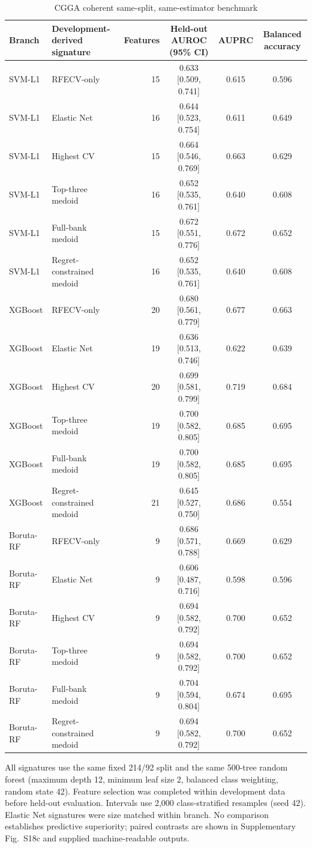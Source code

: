 \begin{table}[H]
\centering
\caption{CGGA coherent same-split, same-estimator benchmark}
\label{tab:supp17}
\scriptsize
\begin{tabular}{llrccc}
\toprule
Branch & Development-derived signature & Features & Held-out AUROC (95\% CI) & AUPRC & Balanced accuracy \\
\midrule
SVM-L1 & RFECV-only & 15 & 0.633 [0.509, 0.741] & 0.615 & 0.596 \\
SVM-L1 & Elastic Net & 16 & 0.644 [0.523, 0.754] & 0.611 & 0.649 \\
SVM-L1 & Highest CV & 15 & 0.664 [0.546, 0.769] & 0.663 & 0.629 \\
SVM-L1 & Top-three medoid & 16 & 0.652 [0.535, 0.761] & 0.640 & 0.608 \\
SVM-L1 & Full-bank medoid & 15 & 0.672 [0.551, 0.776] & 0.672 & 0.652 \\
SVM-L1 & Regret-constrained medoid & 16 & 0.652 [0.535, 0.761] & 0.640 & 0.608 \\
XGBoost & RFECV-only & 20 & 0.680 [0.561, 0.779] & 0.677 & 0.663 \\
XGBoost & Elastic Net & 19 & 0.636 [0.513, 0.746] & 0.622 & 0.639 \\
XGBoost & Highest CV & 20 & 0.699 [0.581, 0.799] & 0.719 & 0.684 \\
XGBoost & Top-three medoid & 19 & 0.700 [0.582, 0.805] & 0.685 & 0.695 \\
XGBoost & Full-bank medoid & 19 & 0.700 [0.582, 0.805] & 0.685 & 0.695 \\
XGBoost & Regret-constrained medoid & 21 & 0.645 [0.527, 0.750] & 0.686 & 0.554 \\
Boruta-RF & RFECV-only & 9 & 0.686 [0.571, 0.788] & 0.669 & 0.629 \\
Boruta-RF & Elastic Net & 9 & 0.606 [0.487, 0.716] & 0.598 & 0.596 \\
Boruta-RF & Highest CV & 9 & 0.694 [0.582, 0.792] & 0.700 & 0.652 \\
Boruta-RF & Top-three medoid & 9 & 0.694 [0.582, 0.792] & 0.700 & 0.652 \\
Boruta-RF & Full-bank medoid & 9 & 0.704 [0.594, 0.804] & 0.674 & 0.695 \\
Boruta-RF & Regret-constrained medoid & 9 & 0.694 [0.582, 0.792] & 0.700 & 0.652 \\
\bottomrule
\end{tabular}
\begin{minipage}{0.98\linewidth}\scriptsize\vspace{0.3em}
All signatures use the same fixed 214/92 split and the same 500-tree random forest (maximum depth 12, minimum leaf size 2, balanced class weighting, random state 42). Feature selection was completed within development data before held-out evaluation. Intervals use 2,000 class-stratified resamples (seed 42). Elastic Net signatures were size matched within branch. No comparison establishes predictive superiority; paired contrasts are shown in Supplementary Fig.~S18c and supplied machine-readable outputs.
\end{minipage}
\end{table}

